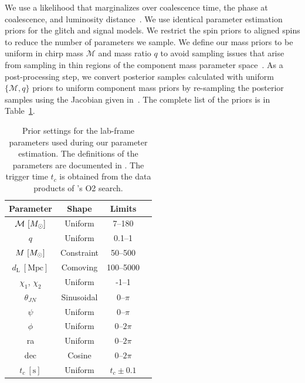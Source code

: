 \documentclass[useAMS,fleqn, usenatbib, final]{mnras}
\newcommand{\pycbc}{{\sc {{PyCBC}}}\xspace}
\newcommand{\mathcmd}[1]{{\sc \relax\ifmmode#1\else $#1$\fi}\xspace}
\newcommand{\msun}{\mathcmd{M_\odot}}
\begin{document}
We use a likelihood that marginalizes over coalescence time, the phase at coalescence, and luminosity distance~\citep[see][Eq.~80]{intro_to_gw_bayes}. We use identical parameter estimation priors for the glitch and signal models. We restrict the spin priors to aligned spins to reduce the number of parameters we sample. We define our mass priors to be uniform in chirp mass $\mathcal{M}$ and mass ratio $q$ to avoid sampling issues that arise from sampling in thin regions of the component mass parameter space~\citep{bilby_gwtc}. As a post-processing step, we convert posterior samples calculated with uniform $\{\mathcal{M}, q\}$ priors to uniform component mass priors by re-sampling the posterior samples using the Jacobian given in~\citet[Eq.~21]{Veitch:2015:PhRvD}. The complete list of the priors is in Table~\ref{tab:priors}.


\begin{table}
    \centering
    \caption{
    Prior settings for the lab-frame parameters used during our parameter estimation. The definitions of the parameters are documented in \citet[Table~E1]{bilby_gwtc}. The trigger time $t_c$ is obtained from the data products of \pycbc's O2 search.  \label{tab:priors}} 
    \begin{tabular}{c c c c}
    \hline
    Parameter & Shape & Limits \\
    \hline
          $\mathcal{M}\ [\msun]$           & Uniform & 7--180  \\
          $q$                           & Uniform & 0.1--1  \\
          $M\ [\msun]$                     & Constraint & 50--500  \\
          $d_\mathrm{L}\ [\mathrm{Mpc}]$   & Comoving & 100--5000  \\
          $\chi_1$, $\chi_2$            & Uniform & -1--1  \\
          $\theta_{JN}$                 & Sinusoidal & 0--$\pi$  \\
          $\psi$                        & Uniform & 0--$\pi$  \\
          $\phi$                        & Uniform & 0--$2\pi$  \\
          ra                            & Uniform & 0--$2\pi$  \\
          dec                           & Cosine & 0--$2\pi$  \\
          $t_c\ [\mathrm{s}]$              & Uniform & $t_c\pm0.1$  \\
    \hline
    \end{tabular}
\end{table}
\end{document}

